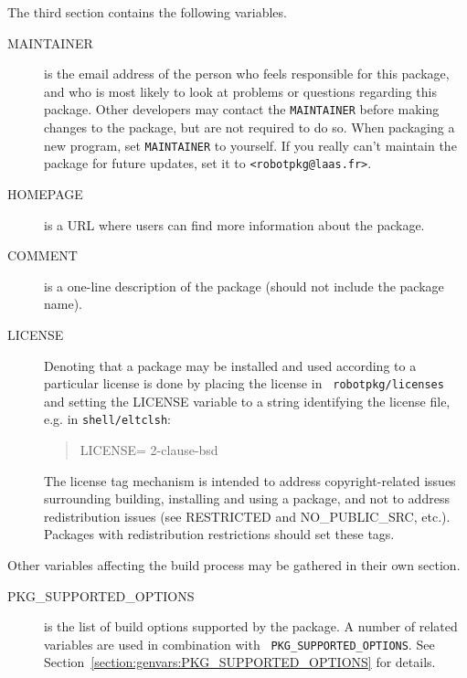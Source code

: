 The third section contains the following variables.

\begin{description}

   \item[MAINTAINER] is the email address of the person who feels responsible
   for this package, and who is most likely to look at problems or questions
   regarding this package. Other developers may contact the {\tt MAINTAINER}
   before making changes to the package, but are not required to do so. When
   packaging a new program, set {\tt MAINTAINER} to yourself. If you really
   can't maintain the package for future updates, set it to
   {\tt \string<robotpkg@laas.fr\string>}.

   \smallbreak
   \item[HOMEPAGE] is a URL where users can find more information about the
   package.

   \smallbreak
   \item[COMMENT] is a one-line description of the package (should not include
   the package name).

   \smallbreak
   \item[LICENSE] Denoting that a package may be installed and used according
   to a particular license is done by placing the license in {\tt
   robotpkg/licenses} and setting the LICENSE variable to a string identifying
   the license file, e.g. in {\tt shell/eltclsh}:
   \begin{quote}
      LICENSE=		2-clause-bsd
   \end{quote}

   The license tag mechanism is intended to address copyright-related issues
   surrounding building, installing and using a package, and not to address
   redistribution issues (see RESTRICTED and NO\_PUBLIC\_SRC, etc.). Packages
   with redistribution restrictions should set these tags.

\end{description}


Other variables affecting the build process may be gathered in their own
section.

\begin{description}

   \item[PKG\_SUPPORTED\_OPTIONS] is the list of build options supported by the
   package. A number of related variables are used in combination with {\tt
   PKG\_SUPPORTED\_OPTIONS}. See 
   {Section~\ref{section:genvars:PKG_SUPPORTED_OPTIONS}} for details.

\end{description}


